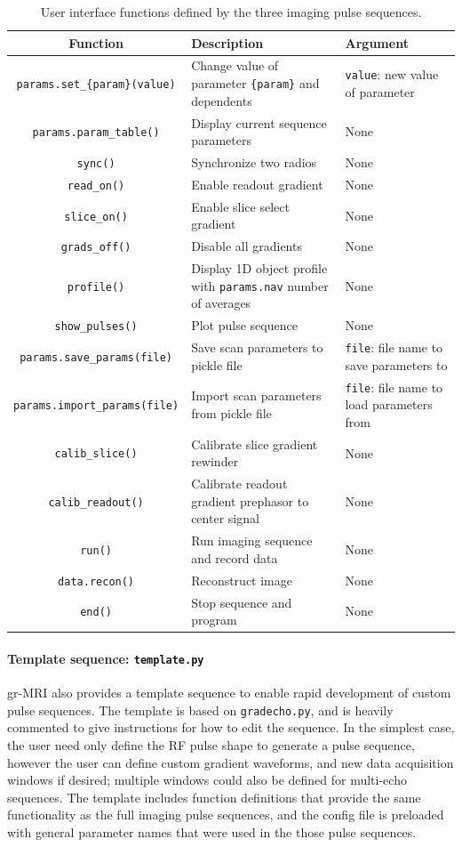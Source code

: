 \documentclass[review]{elsarticle}
\begin{document}
\begin{table}
\begin{tabularx}{\textwidth}{|c|X|X|}
	\hline
	\textbf{Function} & \textbf{Description} & \textbf{Argument}\\ \hline
	\texttt{params.set\_\{param\}(value)} & Change value of parameter \texttt{\{param\}} and dependents & \texttt{value}: new value of parameter \\ \hline
	\texttt{params.param\_table()} & Display current sequence parameters & None \\ \hline
	\texttt{sync()} & Synchronize two radios & None \\ \hline
	\texttt{read\_on()} & Enable readout gradient & None \\ \hline
	\texttt{slice\_on()} & Enable slice select gradient & None \\ \hline
	\texttt{grads\_off()} & Disable all gradients & None \\ \hline
	\texttt{profile()} & Display 1D object profile with \texttt{params.nav} number of averages & None\\ \hline
	\texttt{show\_pulses()} & Plot pulse sequence & None \\ \hline
	\texttt{params.save\_params(file)} & Save scan parameters to pickle file & \texttt{file}: file name to save parameters to\\ \hline
	\texttt{params.import\_params(file)} & Import scan parameters from pickle file & \texttt{file}: file name to load parameters from\\ \hline
	\texttt{calib\_slice()} & Calibrate slice gradient rewinder & None \\ \hline
	\texttt{calib\_readout()} & Calibrate readout gradient prephasor to center signal & None \\ \hline
	\texttt{run()} & Run imaging sequence and record data & None \\ \hline
	\texttt{data.recon()} & Reconstruct image & None \\ \hline
	\texttt{end()} & Stop sequence and program & None\\ \hline	
\end{tabularx}
\caption{User interface functions defined by the three imaging pulse sequences.}
\label{table:sequencefunctions}
\end{table}

\paragraph{Template sequence: \texttt{template.py}} 
gr-MRI also provides a template sequence to enable rapid development of custom pulse sequences.  
The template is based on \texttt{gradecho.py}, 
and is heavily commented to give instructions for how to edit the sequence.  
In the simplest case, the user need only define the RF pulse shape to generate a pulse sequence, 
however the user can define custom gradient waveforms, and new data acquisition windows if desired; 
multiple windows could also be defined for multi-echo sequences.  
The template includes function definitions that provide the same functionality as the full imaging pulse sequences, 
and the config file is preloaded with general parameter names that were used in the those pulse sequences.
\end{document}
